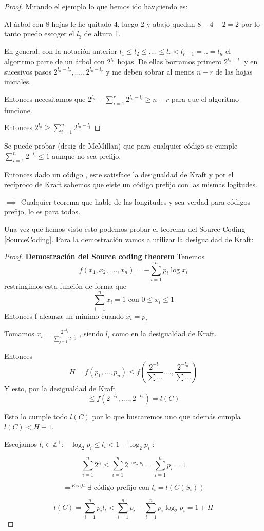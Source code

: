 \begin{proof}
	Mirando el ejemplo lo que hemos ido hav¡ciendo es:
	
	Al árbol con 8 hojas le he quitado 4, luego 2 y abajo quedan $8-4-2 = 2$ por lo tanto puedo escoger el $l_3$ de altura 1.
	
	En general, con la notación anterior $l_1 \leq l_2 \leq .... \leq l_{r} < l_{r+1} = .. = l_n$ el algoritmo parte de un árbol con $2^{l_n}$ hojas. De ellas borramos primero $2^{l_n - l_1}$ y en sucesivos pasos $2^{l_n - l_2} , .... , 2^{l_n - l_r}$ y me deben sobrar al menos $n-r$ de las hojas iniciales.
	
	Entonces necesitamos que $2^{l_n} - \sum_{i=1}^{r} 2^{l_n - l_i} \geq n-r$ para que el algoritmo funcione.
	
	Entonces $2^{l_n} \geq \sum_{i=1}^{n} 2^{l_n - l_i}$
\end{proof}

\obs Se puede probar (desig de McMillan) que para cualquier código se cumple $\sum_{i=1}^{n} 2^{-l_i} \leq 1$ aunque no sea prefijo.

Entonces dado un código , este satisface la desigualdad de Kraft y por el recíproco de Kraft sabemos que eiste un código prefijo con las mismas logitudes.

$\implies$ Cualquier teorema que hable de las longitudes y sea verdad para códigos prefijo, lo es para todos.


Una vez que hemos visto esto podemos probar el teorema del Source Coding \ref{SourceCoding}. Para la demostración vamos a utilizar la desigualdad de Kraft:

\begin{proof}
	\textbf{Demostración del Source coding theorem}
	Tenemos
	$$f(x_1 , x_2 , ...., x_n) = -\sum_{i=1}^{n} p_i \log x_i$$
	restringimos esta función de forma que
	$$\sum_{i=1}^{n} x_i = 1 \text{   con   } 0 \leq x_i \leq 1$$
	Entonces f alcanza un mínimo cuando $x_i = p_i$
	
	Tomamos $x_i = \frac{2^{-l_i}}{\sum_{j=1}^{n} 2^{-l_j}}$ , siendo $l_i$ como en la desigualdad de Kraft.
		
		Entonces
		$$H= f(p_1,...,p_n) \leq f (\frac{2^{-l_1}}{\sum ...} .... , \frac{2^{-l_n}}{\sum ...})$$
		Y esto, por la desigualdad de Kraft
		$$\leq f(2^{-l_1} , .... , 2^{-l_n}) = l(C)$$

	Esto lo cumple todo $l(C)$ por lo que buscaremos uno que además cumpla $l(C) < H+1$.

	Escojamos $l_i \in \mathbb{Z}^+ : -\log_2 p_i \leq l_i < 1 - \log_2 p_i$ :

	$$\sum^{n}_{i = 1} 2^{l_i} \leq \sum^{n}_{i = 1} 2^{\log_2 p_i} = \sum^{n}_{i = 1} p_i = 1 $$

	$$\Rightarrow^{Kraft} \exists \text{ código prefijo con } l_i = l(C(S_i))$$

	$$l(C) = \sum^{n}_{i = 1} p_i l_i < \sum^{n}_{i = 1} p_i - \sum^{n}_{i = 1} p_i \log_{2} p_i = 1 + H$$

\end{proof}

